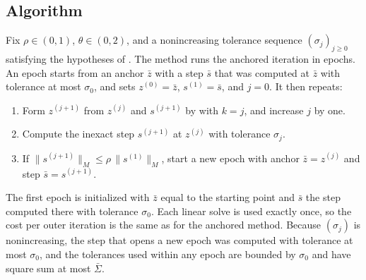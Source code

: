 \subsection{Algorithm}
Fix $\rho \in (0,1)$, $\theta \in (0,2)$, and a nonincreasing tolerance sequence $(\sigma_j)_{j\ge 0}$ satisfying the hypotheses of .
The method runs the anchored iteration in epochs.
An epoch starts from an anchor $\bar z$ with a step $\bar s$ that was computed at $\bar z$ with tolerance at most $\sigma_0$, and sets $z^{(0)} = \bar z$, $s^{(1)} = \bar s$, and $j = 0$.
It then repeats:
\begin{enumerate}
    \item Form $z^{(j+1)}$ from $z^{(j)}$ and $s^{(j+1)}$ by  with $k = j$, and increase $j$ by one.
    \item Compute the inexact step $s^{(j+1)}$ at $z^{(j)}$ with tolerance $\sigma_j$.
    \item If $\|s^{(j+1)}\|_M \le \rho\,\|s^{(1)}\|_M$, start a new epoch with anchor $\bar z = z^{(j)}$ and step $\bar s = s^{(j+1)}$.
\end{enumerate}
The first epoch is initialized with $\bar z$ equal to the starting point and $\bar s$ the step computed there with tolerance $\sigma_0$.
Each linear solve is used exactly once, so the cost per outer iteration is the same as for the anchored method.
Because $(\sigma_j)$ is nonincreasing, the step that opens a new epoch was computed with tolerance at most $\sigma_0$, and the tolerances used within any epoch are bounded by $\sigma_0$ and have square sum at most $\bar\Sigma$.

